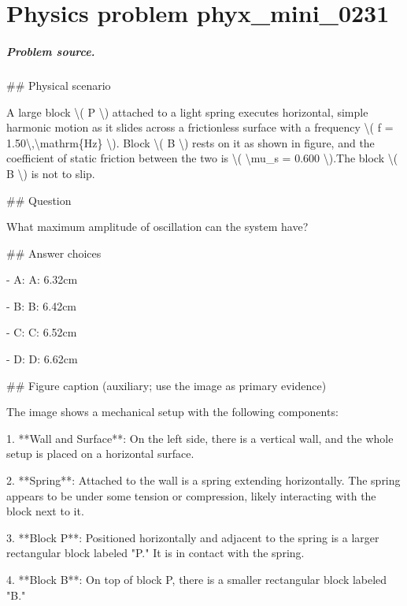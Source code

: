 
\chapter{Physics problem phyx\_mini\_0231}
\label{ch:PhyXMiniProblems_problem_phyx_mini_0231}

\paragraph{Problem source.}
\#\# Physical scenario

A large block \textbackslash{}( P \textbackslash{}) attached to a light spring executes horizontal, simple harmonic motion as it slides across a frictionless surface with a frequency \textbackslash{}( f = 1.50\textbackslash{},\textbackslash{}mathrm\{Hz\} \textbackslash{}). Block \textbackslash{}( B \textbackslash{}) rests on it as shown in figure, and the coefficient of static friction between the two is \textbackslash{}( \textbackslash{}mu\_s = 0.600 \textbackslash{}).The block \textbackslash{}( B \textbackslash{}) is not to slip.

\#\# Question

What maximum amplitude of oscillation can the system have?

\#\# Answer choices

- A: A: 6.32cm

- B: B: 6.42cm

- C: C: 6.52cm

- D: D: 6.62cm

\#\# Figure caption (auxiliary; use the image as primary evidence)

The image shows a mechanical setup with the following components:

1. **Wall and Surface**: On the left side, there is a vertical wall, and the whole setup is placed on a horizontal surface.

2. **Spring**: Attached to the wall is a spring extending horizontally. The spring appears to be under some tension or compression, likely interacting with the block next to it.

3. **Block P**: Positioned horizontally and adjacent to the spring is a larger rectangular block labeled "P." It is in contact with the spring.

4. **Block B**: On top of block P, there is a smaller rectangular block labeled "B." 

